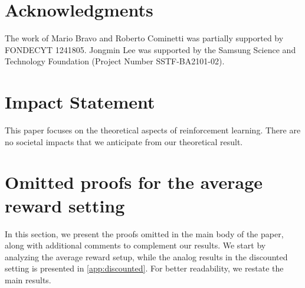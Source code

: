 \documentclass{article}
\theoremstyle{plain}
\theoremstyle{definition}
\theoremstyle{remark}
\begin{document}
\section*{Acknowledgments} The work of Mario Bravo and Roberto Cominetti was partially supported by FONDECYT 1241805. Jongmin Lee was supported by the Samsung Science and Technology Foundation (Project Number SSTF-BA2101-02).


\section*{Impact Statement}
This paper focuses on the theoretical aspects of reinforcement learning. There are no societal
impacts that we anticipate from our theoretical result.






\newpage
\appendix
\onecolumn
\section{Omitted proofs for the average reward setting} \label{app:average}
In this section, we present the proofs omitted in the main body of the paper, along with additional comments to complement our results. We start by analyzing the average reward setup, while the analog results in the discounted setting is presented in \cref{app:discounted}. For better readability, we restate the main results.
\end{document}
